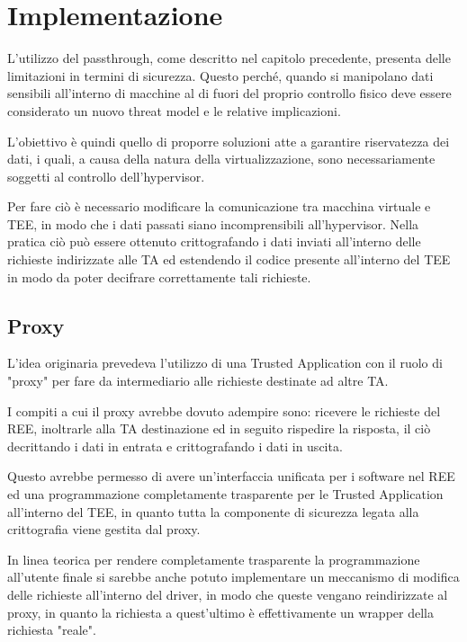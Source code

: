 \documentclass[12pt,italian]{report}
\begin{document}
	\chapter{Implementazione}
	\label{cap:implementazione}
	
	L'utilizzo del passthrough, come descritto nel capitolo precedente, presenta delle limitazioni in termini di sicurezza. Questo perché, quando si manipolano dati sensibili all'interno di macchine al di fuori del proprio controllo fisico deve essere considerato un nuovo threat model e le relative implicazioni. 
	
	L'obiettivo è quindi quello di proporre soluzioni atte a garantire riservatezza dei dati, i quali, a causa della natura della virtualizzazione, sono necessariamente soggetti al controllo dell'hypervisor.
	
	\bigbreak
	
	Per fare ciò è necessario modificare la comunicazione tra macchina virtuale e TEE, in modo che i dati passati siano incomprensibili all'hypervisor. Nella pratica ciò può essere ottenuto crittografando i dati inviati all'interno delle richieste indirizzate alle TA ed estendendo il codice presente all'interno del TEE in modo da poter decifrare correttamente tali richieste. 
	
	\section{Proxy}
	\label{sec:proxy}
	L'idea originaria prevedeva l'utilizzo di una Trusted Application con il ruolo di "proxy" per fare da intermediario alle richieste destinate ad altre TA. 
	
	I compiti a cui il proxy avrebbe dovuto adempire sono: ricevere le richieste del REE, inoltrarle alla TA destinazione ed in seguito rispedire la risposta, il ciò decrittando i dati in entrata e crittografando i dati in uscita.
	
	\bigbreak
	
	Questo avrebbe permesso di avere un'interfaccia unificata per i software nel REE ed una programmazione completamente trasparente per le Trusted Application all'interno del TEE, in quanto tutta la componente di sicurezza legata alla crittografia viene gestita dal proxy. 
	
	In linea teorica per rendere completamente trasparente la programmazione all'utente finale si sarebbe anche potuto implementare un meccanismo di modifica delle richieste all'interno del driver, in modo che queste vengano reindirizzate al proxy, in quanto la richiesta a quest'ultimo è effettivamente un wrapper della richiesta "reale".
	
\end{document}
